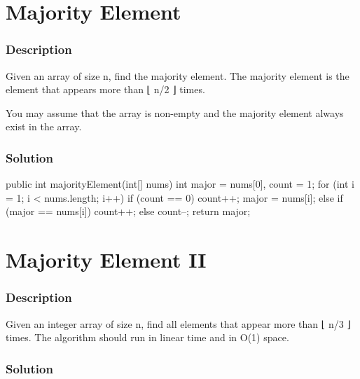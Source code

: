 \newpage

\section{Majority Element} %

\subsubsection{Description}
Given an array of size n, find the majority element. The majority element is the element that appears more than ⌊ n/2 ⌋ times.

You may assume that the array is non-empty and the majority element always exist in the array.

\subsubsection{Solution}

\begin{Code}
public int majorityElement(int[] nums) {
    int major = nums[0], count = 1;
    for (int i = 1; i < nums.length; i++) {
        if (count == 0) {
            count++;
            major = nums[i];
        } else if (major == nums[i]) {
            count++;
        } else {
            count--;
        }
    }
    return major;
}
\end{Code}

\newpage

\section{Majority Element II} %

\subsubsection{Description}
Given an integer array of size n, find all elements that appear more than ⌊ n/3 ⌋ times. The algorithm should run in linear time and in O(1) space.

\subsubsection{Solution}

